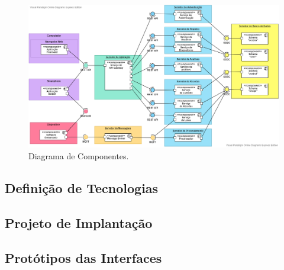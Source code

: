 \begin{figure}[ht]
    \centering
    \includegraphics[scale=0.50, angle=270]{figuras/projeto/software/diagrama_componentes.png}
    \caption{Diagrama de Componentes.}
    \label{fig:diagrama_componentes}
\end{figure}

\subsection{Definição de Tecnologias}

\subsection{Projeto de Implantação}

\subsection{Protótipos das Interfaces}

